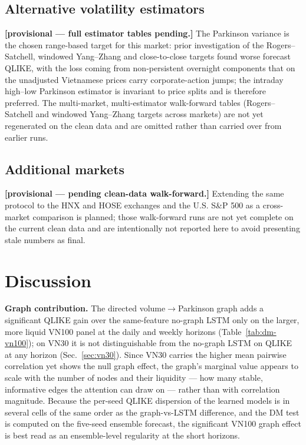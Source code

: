 \documentclass[runningheads]{llncs}
\begin{document}
\subsection{Alternative volatility estimators}\label{sec:est}
\textbf{[provisional --- full estimator tables pending.]} The Parkinson variance is the chosen
range-based target for this market: prior investigation of the Rogers--Satchell, windowed
Yang--Zhang and close-to-close targets found worse forecast QLIKE, with the loss coming from
non-persistent overnight components that on the unadjusted Vietnamese prices carry corporate-action
jumps; the intraday high--low Parkinson estimator is invariant to price splits and is therefore
preferred. The multi-market, multi-estimator walk-forward tables (Rogers--Satchell and windowed
Yang--Zhang targets across markets) are not yet regenerated on the clean data and are omitted rather
than carried over from earlier runs.

\subsection{Additional markets}
\textbf{[provisional --- pending clean-data walk-forward.]} Extending the same protocol to the HNX and
HOSE exchanges and the U.S. S\&P 500 as a cross-market comparison is planned; those walk-forward runs
are not yet complete on the current clean data and are intentionally not reported here to avoid
presenting stale numbers as final.

\FloatBarrier
\section{Discussion}\label{sec:disc}
\textbf{Graph contribution.} The directed volume$\to$Parkinson graph adds a significant QLIKE gain
over the same-feature no-graph LSTM only on the larger, more liquid VN100 panel at the daily and
weekly horizons (Table~\ref{tab:dm-vn100}); on VN30 it is not distinguishable from the no-graph LSTM
on QLIKE at any horizon (Sec.~\ref{sec:vn30}). Since VN30 carries the higher mean pairwise correlation
yet shows the null graph effect, the graph's marginal value appears to scale with the number of nodes
and their liquidity --- how many stable, informative edges the attention can draw on --- rather than
with correlation magnitude. Because the per-seed QLIKE dispersion of the learned models is in several
cells of the same order as the graph-vs-LSTM difference, and the DM test is computed on the five-seed
ensemble forecast, the significant VN100 graph effect is best read as an ensemble-level regularity at
the short horizons.
\end{document}
